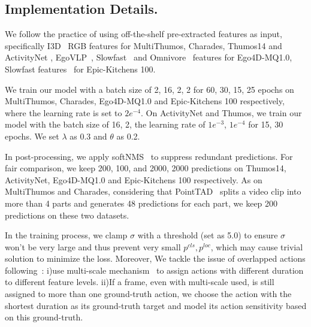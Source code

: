 \documentclass[10pt,twocolumn,letterpaper]{article}
\begin{document}
\subsection{Implementation Details.} 
\par We follow the practice of using off-the-shelf pre-extracted features as input, specifically I3D~\cite{i3d} RGB features for MultiThumos, Charades, Thumos14 and ActivityNet , EgoVLP~\cite{kevin2022egovlp}, Slowfast~\cite{slowfast} and Omnivore~\cite{girdhar2022omnivore} features for Ego4D-MQ1.0, Slowfast features~\cite{slowfast,Damen2022RESCALING} for Epic-Kitchens 100.  
\par We train our model with a batch size of 2, 16, 2, 2 for 60, 30, 15, 25 epochs on MultiThumos, Charades, Ego4D-MQ1.0 and Epic-Kitchens 100 respectively, where the learning rate is set to $2e^{-4}$. On ActivityNet and Thumos, we train our model with the batch size of 16, 2, the learning rate of $1e^{-3}$, $1e^{-4}$  for 15, 30 epochs. We set $\lambda$ as 0.3 and $\theta$ as 0.2. 
\par In post-processing, we apply softNMS~\cite{softnms} to suppress redundant predictions. For fair comparison, we keep 200, 100, and 2000, 2000 predictions on Thumos14, ActivityNet, Ego4D-MQ1.0 and Epic-Kitchens 100 respectively. As on MultiThumos and Charades, considering that PointTAD~\cite{tanpointtad} splits a video clip into more than 4 parts and generates 48 predictions for each part, we keep 200 predictions on these two datasets. 
\par In the training process, we clamp $\sigma$ with a threshold (set as 5.0) to ensure $\sigma$ won’t be very large and thus prevent very small $p^{cls}, p^{loc}$, which may cause trivial solution to minimize the loss. Moreover, We tackle the issue of overlapped actions following~\cite{zhang2022actionformer,tian2019fcos}: i)use multi-scale mechanism~\cite{fpn} to assign actions with different
duration to different feature levels. ii)If a frame, even with multi-scale used, is still assigned to more than one ground-truth action, we choose the action with the shortest duration as its ground-truth target and model its action sensitivity based on this ground-truth.
\end{document}
